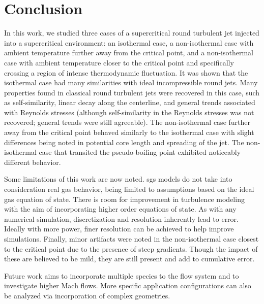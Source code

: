 \chapter{Conclusion}

In this work, we studied three cases of a supercritical round turbulent jet injected into a supercritical environment: an isothermal case, a non-isothermal case with ambient temperature further away from the critical point, and a non-isothermal case with ambient temperature closer to the critical point and specifically crossing a region of intense thermodynamic fluctuation. It was shown that the isothermal case had many similarities with ideal incompressible round jets. Many properties found in classical round turbulent jets were recovered in this case, such as self-similarity, linear decay along the centerline, and general trends associated with Reynolds stresses (although self-similarity in the Reynolds stresses was not recovered; general trends were still agreeable). The non-isothermal case further away from the critical point behaved similarly to the isothermal case with slight differences being noted in potential core length and spreading of the jet. The non-isothermal case that transited the pseudo-boiling point exhibited noticeably different behavior.

Some limitations of this work are now noted. \gls{sgs} models do not take into consideration real gas behavior, being limited to assumptions based on the ideal gas equation of state. There is room for improvement in turbulence modeling with the aim of incorporating higher order equations of state. As with any numerical simulation, discretization and resolution inherently lead to error. Ideally with more power, finer resolution can be achieved to help improve simulations. Finally, minor artifacts were noted in the non-isothermal case closest to the critical point due to the presence of steep gradients. Though the impact of these are believed to be mild, they are still present and add to cumulative error. 

Future work aims to incorporate multiple species to the flow system and to investigate higher Mach flows. More specific application configurations can also be analyzed via incorporation of complex geometries. 


